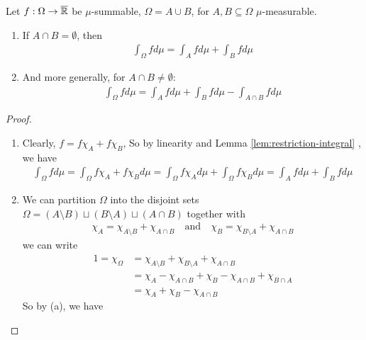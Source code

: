 \begin{prop}[]\label{prop:split-integral}
Let $f: \Omega \to \overline{\mathbb{R}}$ be $\mu$-summable, $\Omega = A \cup B$, for $A,B \subseteq \Omega$ $\mu$-measurable.
\begin{enumerate}
  \item If $A \cap B = \emptyset$, then
    \begin{align*}
      \int_{\Omega} f d \mu
      =
      \int_{A} f d \mu
      +
      \int_{B} f d \mu
    \end{align*}
  \item And more generally, for $A \cap B \neq \emptyset$:
    \begin{align*}
      \int_{\Omega} f d \mu
      =
      \int_{A} f d \mu
      +
      \int_{B} f d \mu
      -
      \int_{A \cap B} f d \mu
    \end{align*}
\end{enumerate}

\end{prop}
\begin{proof}
  \begin{enumerate}
    \item 
  Clearly, $f = f \chi_{A} + f \chi_B$, So by linearity and Lemma \ref{lem:restriction-integral} , we have
  \begin{align*}
    \int_{\Omega} f d \mu
    =
    \int_{\Omega} f \chi_A + f \chi_B d \mu
    = 
    \int_{\Omega} f \chi_A d \mu
    + 
    \int_{\Omega} f \chi_B d \mu
    =
    \int_{A} f d \mu
    +
    \int_{B} f d \mu
  \end{align*}
  \item We can partition $\Omega$ into the disjoint sets
    $
    \Omega = (A \setminus B) \sqcup (B \setminus A) \sqcup (A \cap B)
    $
    together with
    \begin{align*}
      \chi_A = \chi_{A \setminus B} + \chi_{A \cap B}
      \quad \text{and} \quad 
      \chi_B = \chi_{B \setminus A} + \chi_{A \cap B}
    \end{align*}
    we can write
    \begin{align*}
      1 = \chi_{\Omega}
      &=
      \chi_{A \setminus B} + \chi_{B \setminus A} +\chi_{A \cap B}
      \\
      &=
      \chi_A - \chi_{A \cap B}
      +
      \chi_B - \chi_{A \cap B}
      +
      \chi_{B \cap A}
      \\
      &=
      \chi_A + \chi_B - \chi_{A \cap B}
    \end{align*}
    So by (a), we have


\end{enumerate}
\end{proof}




